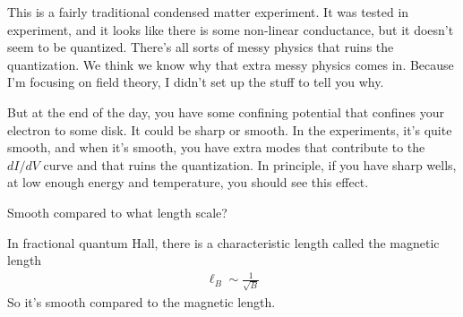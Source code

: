 This is a fairly traditional condensed matter experiment.
It was tested in experiment,
and it looks  like there is some non-linear conductance,
but it doesn't seem to be quantized.
There's all sorts of messy physics that ruins the quantization.
We think we know why that extra messy physics comes in.
Because I'm focusing on field theory,
I didn't set up the stuff to tell you why.

But at the end of the day,
you have some confining potential that confines your electron to some disk.
It could be sharp or smooth.
In the experiments,
it's quite smooth,
and when it's smooth,
you have extra modes that contribute to the $dI/dV$ curve
and that ruins the quantization.
In principle,
if you have sharp wells,
at low enough energy and temperature,
you should see this effect.

\begin{question}
    Smooth compared to what length scale?
\end{question}
In fractional quantum Hall,
there is a characteristic length called the magnetic length
\begin{align}
    \ell_B \sim \frac{1}{\sqrt{B}}
\end{align}
So it's smooth compared to the magnetic length.
